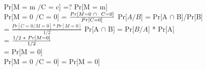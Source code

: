 \documentclass[11pt]{article}
\begin{document}
	Pr[M = m $/$C = c] =? Pr[M = m]\\
	Pr[M = 0 $/$C = 0] = $\frac{Pr[M = 0\hspace{0.1cm} \cap\hspace{0.1cm}\ C = 0]}{Pr[C = 0]}$ \hfill Pr[$A/B$] = Pr[A $\displaystyle \cap$ B]/Pr[B]\\
	\hspace{3.4cm}= $\frac{Pr[C = 0/M = 0] * Pr[M = 0]}{1/2}$ \hfill Pr[A $\displaystyle \cap$ B] = Pr[$B/A$] * Pr[A] \\
	\hspace{3.4cm}= $\frac{1/2 \hspace{0.1cm}*\hspace{0.1cm} Pr[M = 0]}{1/2}$\\
	\hspace{3.4cm}= Pr[M = 0]\\
	Pr[M = 0 $/$C = 0] = Pr[M = 0]\\
	\\
	\flushleft
\end{document}

